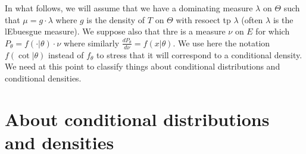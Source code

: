 \documentclass[
	fontsize=11pt, %
	twoside=false, %
	numbers=noenddot, %
]{kaobook}
\begin{document}
In what follows, we will assume that we have a dominating measure $\lambda$ on $\Theta$ such that $\mu = g \cdot \lambda$ where $g$ is the density of $T$ on $\Theta$ with resoect tp $\lambda$ (often $\lambda$ is the lEbuesgue measure).
We suppose also that thre is a measure $\nu$ on $E$ for which $P_\theta = f(\cdot | \theta) \cdot \nu$ where similarly $\frac{d P_\theta}{d \nu} = f(x | \theta)$. 
We use here the notation $f(\cot | \theta)$ instead of $f_\theta$ to stress that it will correspond to a conditional density.
We need at this point to classify things about conditional distributions and conditional densities.

\section{About conditional distributions and densities} %
\label{sec:about_conditional_distributions_and_densities}
\end{document}
